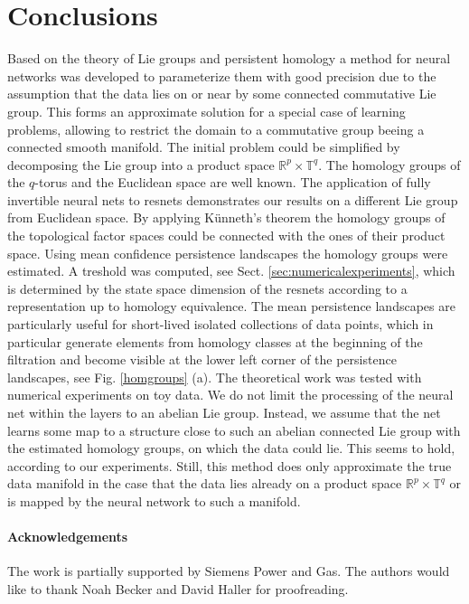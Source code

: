 \documentclass[envcountsect,runningheads]{llncs}
\begin{document}
\section{Conclusions}
\label{sec:conclusion}
Based on the theory of Lie groups and persistent homology a method for neural networks was developed to parameterize them with good precision due to the assumption that the data lies on or near by some connected commutative Lie group. This forms an approximate solution for a special case of learning problems, allowing to restrict the domain to a commutative group beeing a connected smooth manifold. The initial problem could be simplified by decomposing the Lie group into a product space $\mathbb{R}^p \times \mathbb{T}^q$. The homology groups of the $q$-torus and the Euclidean space are well known. The application of fully invertible neural nets to resnets demonstrates our results on a different Lie group from Euclidean space. By applying Künneth's theorem the homology groups of the topological factor spaces could be connected with the ones of their product space. Using mean confidence persistence landscapes the homology groups were estimated. A treshold was computed, see Sect. \ref{sec:numericalexperiments}, which is determined by the state space dimension of the resnets according to a representation up to homology equivalence. The mean persistence landscapes are particularly useful for short-lived isolated collections of data points, which in particular generate elements from homology classes at the beginning of the filtration and become visible at the lower left corner of the persistence landscapes, see Fig. \ref{homgroups} (a). The theoretical work was tested with numerical experiments on toy data. We do not limit the processing of the neural net within the layers to an abelian Lie group. Instead, we assume that the net learns some map to a structure close to such an abelian connected Lie group with the estimated homology groups, on which the data could lie. This seems to hold, according to our experiments. Still, this method does only approximate the true data manifold in the case that the data lies already on a product space $\mathbb{R}^p \times \mathbb{T}^q$ or is mapped by the neural network to such a manifold.

\paragraph{Acknowledgements} The work is partially supported by Siemens Power and Gas. The authors would like to thank Noah Becker and David Haller for proofreading.
\end{document}
